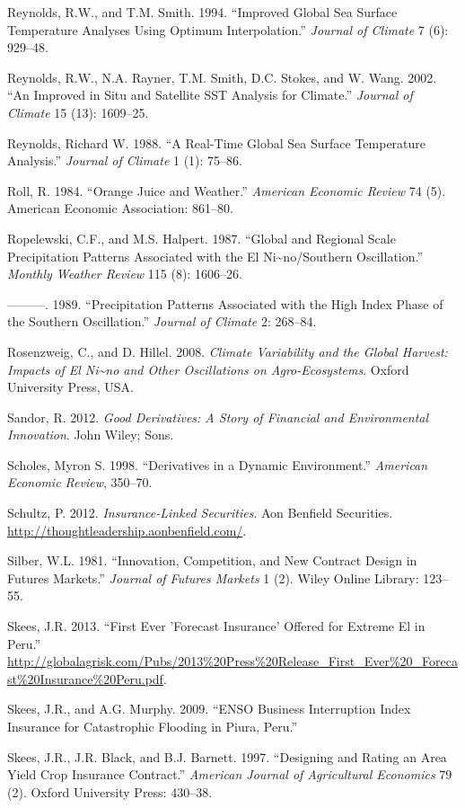 \documentclass[article]{jss}
\begin{document}
Reynolds, R.W., and T.M. Smith. 1994. ``Improved Global Sea Surface
Temperature Analyses Using Optimum Interpolation.'' \emph{Journal of
Climate} 7 (6): 929--48.

Reynolds, R.W., N.A. Rayner, T.M. Smith, D.C. Stokes, and W. Wang. 2002.
``An Improved in Situ and Satellite SST Analysis for Climate.''
\emph{Journal of Climate} 15 (13): 1609--25.

Reynolds, Richard W. 1988. ``A Real-Time Global Sea Surface Temperature
Analysis.'' \emph{Journal of Climate} 1 (1): 75--86.

Roll, R. 1984. ``Orange Juice and Weather.'' \emph{American Economic
Review} 74 (5). American Economic Association: 861--80.

Ropelewski, C.F., and M.S. Halpert. 1987. ``Global and Regional Scale
Precipitation Patterns Associated with the El
Ni\textasciitilde{}no/Southern Oscillation.'' \emph{Monthly Weather
Review} 115 (8): 1606--26.

---------. 1989. ``Precipitation Patterns Associated with the High Index
Phase of the Southern Oscillation.'' \emph{Journal of Climate} 2:
268--84.

Rosenzweig, C., and D. Hillel. 2008. \emph{Climate Variability and the
Global Harvest: Impacts of El Ni\textasciitilde{}no and Other
Oscillations on Agro-Ecosystems}. Oxford University Press, USA.

Sandor, R. 2012. \emph{Good Derivatives: A Story of Financial and
Environmental Innovation}. John Wiley; Sons.

Scholes, Myron S. 1998. ``Derivatives in a Dynamic Environment.''
\emph{American Economic Review}, 350--70.

Schultz, P. 2012. \emph{Insurance-Linked Securities}. Aon Benfield
Securities. \url{http://thoughtleadership.aonbenfield.com/}.

Silber, W.L. 1981. ``Innovation, Competition, and New Contract Design in
Futures Markets.'' \emph{Journal of Futures Markets} 1 (2). Wiley Online
Library: 123--55.

Skees, J.R. 2013. ``First Ever 'Forecast Insurance' Offered for Extreme
El in Peru.''
\url{http://globalagrisk.com/Pubs/2013\%20Press\%20Release_First_Ever\%20_Forecast\%20Insurance\%20Peru.pdf}.

Skees, J.R., and A.G. Murphy. 2009. ``ENSO Business Interruption Index
Insurance for Catastrophic Flooding in Piura, Peru.''

Skees, J.R., J.R. Black, and B.J. Barnett. 1997. ``Designing and Rating
an Area Yield Crop Insurance Contract.'' \emph{American Journal of
Agricultural Economics} 79 (2). Oxford University Press: 430--38.
\end{document}
